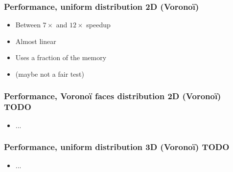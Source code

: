 \documentclass[aspectratio=169]{beamer}
\begin{document}
\begin{frame}
    \frametitle{Performance, uniform distribution 2D (Voronoï)}

    \begin{minipage}[c][0.6\textheight][c]{0.55\textwidth}
        
    \end{minipage}
    \begin{minipage}[c][0.6\textheight][c]{0.4\textwidth}
        \begin{itemize}
            \item Between $7\times$ and $12\times$ speedup

            \bigskip
            \item Almost linear

            \bigskip
            \item Uses a fraction of the memory

            \bigskip
            \item (maybe not a fair test)
        \end{itemize}
    \end{minipage}
\end{frame}


\begin{frame}
    \frametitle{Performance, Voronoï faces distribution 2D (Voronoï)    TODO}

    \begin{minipage}[c][0.6\textheight][c]{0.55\textwidth}
        
    \end{minipage}
    \begin{minipage}[c][0.6\textheight][c]{0.4\textwidth}
        \begin{itemize}
            \item ...
        \end{itemize}
    \end{minipage}
\end{frame}

\begin{frame}
    \frametitle{Performance, uniform distribution 3D (Voronoï)    TODO}

    \begin{minipage}[c][0.6\textheight][c]{0.55\textwidth}
        
    \end{minipage}
    \begin{minipage}[c][0.6\textheight][c]{0.4\textwidth}
        \begin{itemize}
            \item ...
        \end{itemize}
    \end{minipage}
\end{frame}
\end{document}
